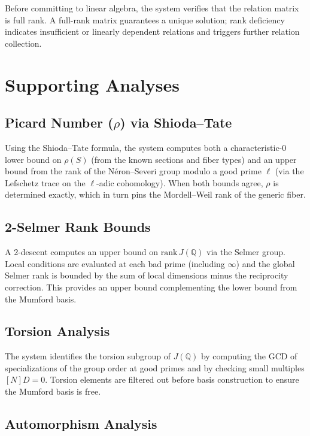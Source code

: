 \documentclass[11pt, a4paper]{article}
\begin{document}
Before committing to linear algebra, the system verifies that the relation matrix is full rank. A full-rank matrix guarantees a unique solution; rank deficiency indicates insufficient or linearly dependent relations and triggers further relation collection.

\section{Supporting Analyses}

\subsection{Picard Number ($\rho$) via Shioda--Tate}

Using the Shioda--Tate formula, the system computes both a characteristic-0 lower bound on $\rho(S)$ (from the known sections and fiber types) and an upper bound from the rank of the N\'eron--Severi group modulo a good prime $\ell$ (via the Lefschetz trace on the $\ell$-adic cohomology). When both bounds agree, $\rho$ is determined exactly, which in turn pins the Mordell--Weil rank of the generic fiber.

\subsection{2-Selmer Rank Bounds}

A 2-descent computes an upper bound on $\text{rank}\, J(\mathbb{Q})$ via the Selmer group. Local conditions are evaluated at each bad prime (including $\infty$) and the global Selmer rank is bounded by the sum of local dimensions minus the reciprocity correction. This provides an upper bound complementing the lower bound from the Mumford basis.

\subsection{Torsion Analysis}

The system identifies the torsion subgroup of $J(\mathbb{Q})$ by computing the GCD of specializations of the group order at good primes and by checking small multiples $[N]D = 0$. Torsion elements are filtered out before basis construction to ensure the Mumford basis is free.

\subsection{Automorphism Analysis}
\end{document}
